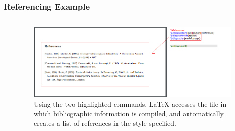 \documentclass[aspectratio = 169]{beamer}
\begin{document}
\begin{frame}
\label{exampleII}
\frametitle{Referencing Example}
\begin{columns}


\hyperlink{introI}{} \newline
\hyperlink{introII}{} \newline 
\hyperlink{scoping}{} \newline
\hyperlink{elaboration}{} \newline  
\hyperlink{software}{} \newline 
\hyperlink{toolchain}{} \newline 
\hyperlink{learning}{} \newline 
\hyperlink{problems}{} \newline 
\hyperlink{results}{} \newline
\hyperlink{exampleI}{} \newline 
\hyperlink{exampleII}{}  



\begin{figure}
\includegraphics[scale = 0.5]{example2}
\caption{Using the two highlighted commands, LaTeX accesses the file in which bibliographic information is compiled, and automatically creates a list of references in the style specified.} 
\end{figure}

\end{columns}
\end{frame}
\end{document}
